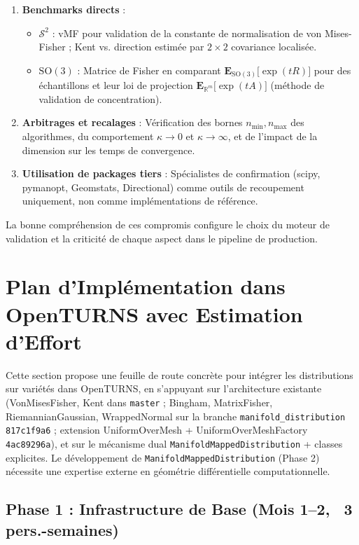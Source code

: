 \documentclass[11pt,a4paper]{article}
\begin{document}
\begin{enumerate}
    \item \textbf{Benchmarks directs} :
    \begin{itemize}
        \item $\mathcal{S}^2$ : vMF pour validation de la constante de normalisation de von Mises-Fisher ; Kent vs. direction estimée par $2 \times 2$ covariance localisée.
        \item $\text{SO}(3)$ : Matrice de Fisher en comparant $\mathbf{E}_{\text{SO}(3)}\bigl[\exp(tR)\bigr]$ pour des échantillons et leur loi de projection $\mathbf{E}_{\mathbb{R}^m}\bigl[\exp(tA)\bigr]$ (méthode de validation de concentration).
    \end{itemize}
    \item \textbf{Arbitrages et recalages} : Vérification des bornes $n_{\text{min}}, n_{\text{max}}$ des algorithmes, du comportement $\kappa\!\to\!0$ et $\kappa\!\to\!\infty$, et de l'impact de la dimension sur les temps de convergence.
    \item \textbf{Utilisation de packages tiers} : Spécialistes de confirmation (scipy, pymanopt, Geomstats, Directional) comme outils de recoupement uniquement, non comme implémentations de référence.
\end{enumerate}

La bonne compréhension de ces compromis configure le choix du moteur de validation et la criticité de chaque aspect dans le pipeline de production.

\section{Plan d'Implémentation dans OpenTURNS avec Estimation d'Effort}

Cette section propose une feuille de route concrète pour intégrer les distributions sur variétés dans OpenTURNS, en s'appuyant sur l'architecture existante (VonMisesFisher, Kent dans \texttt{master} ; Bingham, MatrixFisher, RiemannianGaussian, WrappedNormal sur la branche \texttt{manifold\_distribution} \texttt{817c1f9a6} ; extension UniformOverMesh + UniformOverMeshFactory \texttt{4ac89296a}), et sur le mécanisme dual \texttt{ManifoldMappedDistribution} + classes explicites. Le développement de \texttt{ManifoldMappedDistribution} (Phase 2) nécessite une expertise externe en géométrie différentielle computationnelle.

\subsection{Phase 1 : Infrastructure de Base (Mois 1--2, ~3 pers.-semaines)}
\end{document}
